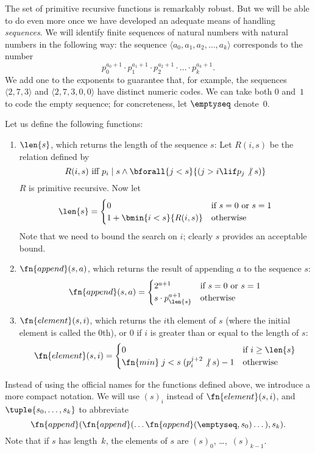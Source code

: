 \documentclass[../../../include/open-logic-section]{subfiles}
\begin{document}

The set of primitive recursive functions is
remarkably robust. But we will be able to do even more once we have
developed an adequate means of handling \emph{sequences}. We will
identify finite sequences of natural numbers with natural numbers in
the following way: the sequence $\langle a_0, a_1, a_2, \dots, a_k \rangle$
corresponds to the number
\[
p_0^{a_0+1} \cdot p_1^{a_1+1} \cdot p_2^{a_2+1} \cdot \dots \cdot
p_k^{a_k+1}.
\]
We add one to the exponents to guarantee that, for example, the
sequences $\langle 2, 7, 3\rangle$ and $\langle 2, 7, 3, 0, 0 \rangle$
have distinct numeric codes. We can take both $0$ and~$1$ to code the
empty sequence; for concreteness, let $\emptyseq$ denote~$0$.

Let us define the following functions:
\begin{enumerate}
\item $\len{s}$, which returns the length of the sequence $s$:
Let $R(i, s)$ be the relation defined by
\[
R(i, s) \text{ iff }
p_i \mid s \land \bforall{j < s}{(j > i \lif
  p_j \mathrel{\not{\mid}} s)}
\]
$R$ is primitive recursive. Now let
\[
\len{s} =
\begin{cases}
0 & \text{if $s = 0$ or $s = 1$} \\
1 + \bmin{i < s}{R(i, s)} & \text{otherwise}
\end{cases}
\]
Note that we need to bound the search on $i$; clearly $s$ provides an
acceptable bound.

\item $\fn{append}(s,a)$, which returns the result of appending $a$ to
  the sequence $s$:
\[
\fn{append}(s,a) =
\begin{cases}
  2^{a+1} & \text{if $s = 0$ or $s = 1$} \\
s \cdot p_{\len{s}}^{a+1} & \text{otherwise}
\end{cases}
\]
\item $\fn{element}(s,i)$, which returns the $i$th element of $s$
  (where the initial element is called the $0$th), or $0$ if $i$ is
  greater than or equal to the length of $s$:
\[
\fn{element}(s,i) =
\begin{cases}
  0 & \mbox{if $i \geq \len{s}$} \\
  \fn{min} \; {j < s} \; (p_i^{j+2} \mathrel{\not{\mid}} s) - 1 & \text{otherwise}
\end{cases}
\]
\end{enumerate}

Instead of using the official names for the functions defined above,
we introduce a more compact notation. We will use $(s)_i$ instead of
$\fn{element}(s,i)$, and $\tuple{s_0, \dots, s_k}$ to abbreviate
\[
\fn{append}(\fn{append}(\dots \fn{append}(\emptyseq,s_0)
\dots),s_k).
\]
Note that if $s$ has length~$k$, the elements of $s$ are
$(s)_0$, \dots,~$(s)_{k-1}$.
\end{document}
